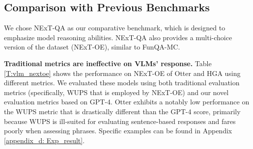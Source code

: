 \subsection{Comparison with Previous Benchmarks}
\label{sec:compare_nextqa}
We chose NExT-QA as our comparative benchmark, which is designed to emphasize model reasoning abilities. NExT-QA also provides a multi-choice version of the dataset (NExT-OE), similar to FunQA-MC.

\noindent\textbf{Traditional metrics are ineffective on VLMs' response.}\quad
Table \ref{T:vlm_nextoe} shows the performance on NExT-OE of Otter and HGA \cite{jiang2020reasoning} using different metrics. We evaluated these models using both traditional evaluation metrics (specifically, WUPS \cite{malinowski2014multi} that is employed by NExT-OE) and our novel evaluation metrics based on GPT-4. Otter exhibits a notably low performance on the WUPS metric that is drastically different than the GPT-4 score, primarily because WUPS is ill-suited for evaluating sentence-based responses and fares poorly when assessing phrases. Specific examples can be found in Appendix \ref{appendix_d: Exp_result}. 


